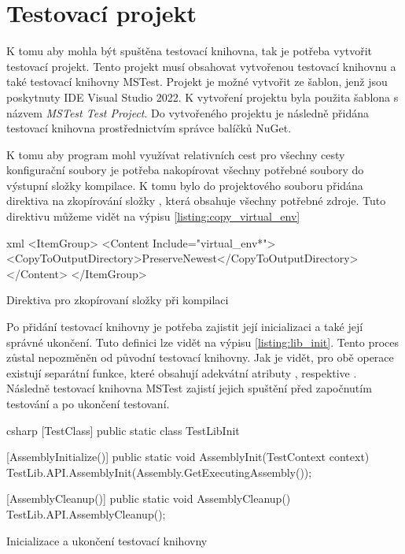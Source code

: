 \section{Testovací projekt}

K tomu aby mohla být spuštěna testovací knihovna, tak je potřeba vytvořit testovací projekt. Tento projekt musí obsahovat vytvořenou testovací knihovnu a také testovací knihovny MSTest. Projekt je možné vytvořit ze šablon, jenž jsou poskytnuty IDE Visual Studio 2022\cite{vs2022}. K vytvoření projektu byla použita šablona s názvem \textit{MSTest Test Project}. Do vytvořeného projektu je následně přidána testovací knihovna prostřednictvím správce balíčků NuGet\cite{nuget}. 

K tomu aby program mohl využívat relativních cest pro všechny cesty konfigurační soubory je potřeba nakopírovat všechny potřebné soubory do výstupní složky kompilace. K tomu bylo do projektového souboru přidána direktiva na zkopírování složky , která obsahuje všechny potřebné zdroje. Tuto direktivu můžeme vidět na výpisu \ref{listing:copy_virtual_env}

\begin{listing}[htbp]
    \centering
    \begin{cminted}[breaklines,autogobble, fontsize=\footnotesize]{xml}
<ItemGroup>
    <Content Include="virtual_env\**">
        <CopyToOutputDirectory>PreserveNewest</CopyToOutputDirectory>
    </Content>
</ItemGroup>
    \end{cminted}
\caption{Direktiva pro zkopírovaní složky při kompilaci}
\label{listing:copy_virtual_env}
\end{listing}


Po přidání testovací knihovny je potřeba zajistit její inicializaci a také její správné ukončení. Tuto definici lze vidět na výpisu \ref{listing:lib_init}. Tento proces zůstal nepozměněn od původní testovací knihovny. Jak je vidět, pro obě operace existují separátní funkce, které obsahují adekvátní atributy , respektive . Následně testovací knihovna MSTest zajistí jejich spuštění před započnutím testování a po ukončení testovaní.  

\begin{listing}[htbp]
    \centering
    \begin{cminted}[breaklines,autogobble, fontsize=\small]{csharp}
[TestClass]
public static class TestLibInit
{
    [AssemblyInitialize()]
    public static void AssemblyInit(TestContext context)
    {
        TestLib.API.AssemblyInit(Assembly.GetExecutingAssembly());
    }

    [AssemblyCleanup()]
    public static void AssemblyCleanup()
    {
        TestLib.API.AssemblyCleanup();
    }
}
    \end{cminted}
\caption{Inicializace a ukončení testovací knihovny}
\label{listing:lib_init}
\end{listing}

